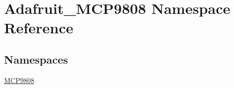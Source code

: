 \hypertarget{namespaceAdafruit__MCP9808}{}\section{Adafruit\+\_\+\+M\+C\+P9808 Namespace Reference}
\label{namespaceAdafruit__MCP9808}
\subsection*{Namespaces}
\begin{DoxyCompactItemize}
\item 
 \hyperlink{namespaceAdafruit__MCP9808_1_1MCP9808}{M\+C\+P9808}
\end{DoxyCompactItemize}
